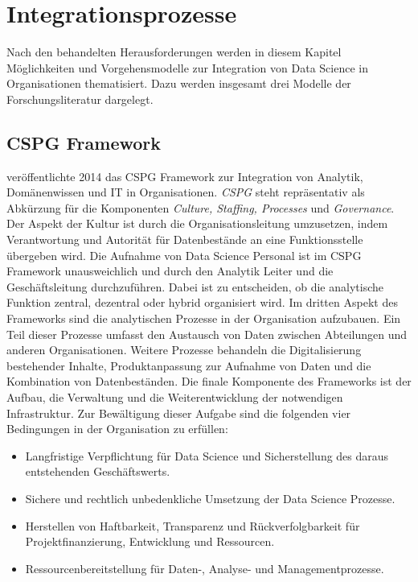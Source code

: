 \chapter[Integrationsprozesse]{Integrationsprozesse}

Nach den behandelten Herausforderungen werden in diesem Kapitel Möglichkeiten und Vorgehensmodelle zur Integration von Data Science in Organisationen thematisiert.
Dazu werden insgesamt drei Modelle der Forschungsliteratur dargelegt.

\section{CSPG Framework}

 veröffentlichte 2014 das CSPG Framework zur Integration von Analytik, Domänenwissen und IT in Organisationen.
\textit{CSPG} steht repräsentativ als Abkürzung für die Komponenten \textit{Culture, Staffing, Processes} und \textit{Governance}. 
Der Aspekt der Kultur ist durch die Organisationsleitung umzusetzen, indem Verantwortung und Autorität für Datenbestände an eine Funktionsstelle übergeben wird.
Die Aufnahme von Data Science Personal ist im CSPG Framework unausweichlich und durch den Analytik Leiter und die Geschäftsleitung durchzuführen. 
Dabei ist zu entscheiden, ob die analytische Funktion zentral, dezentral oder hybrid organisiert wird.
Im dritten Aspekt des Frameworks sind die analytischen Prozesse in der Organisation aufzubauen.
Ein Teil dieser Prozesse umfasst den Austausch von Daten zwischen Abteilungen und anderen Organisationen.
Weitere Prozesse behandeln die Digitalisierung bestehender Inhalte, Produktanpassung zur Aufnahme von Daten und die Kombination von Datenbeständen.
Die finale Komponente des Frameworks ist der Aufbau, die Verwaltung und die Weiterentwicklung der notwendigen Infrastruktur.
Zur Bewältigung dieser Aufgabe sind die folgenden vier Bedingungen in der Organisation zu erfüllen:

\begin{itemize}
    \item Langfristige Verpflichtung für Data Science und Sicherstellung des daraus entstehenden Geschäftswerts.
    \item Sichere und rechtlich unbedenkliche Umsetzung der Data Science Prozesse.
    \item Herstellen von Haftbarkeit, Transparenz und Rückverfolgbarkeit für Projektfinanzierung, Entwicklung und Ressourcen.
    \item Ressourcenbereitstellung für Daten-, Analyse- und Managementprozesse.
\end{itemize}

